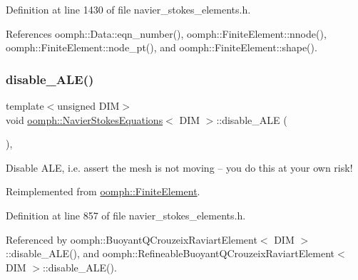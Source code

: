 Definition at line 1430 of file navier\+\_\+stokes\+\_\+elements.\+h.



References oomph\+::\+Data\+::eqn\+\_\+number(), oomph\+::\+Finite\+Element\+::nnode(), oomph\+::\+Finite\+Element\+::node\+\_\+pt(), and oomph\+::\+Finite\+Element\+::shape().

\mbox{\label{classoomph_1_1NavierStokesEquations_a09f47fe68a941eaf9a0080a166eea687}} 
\subsubsection{\texorpdfstring{disable\+\_\+\+A\+L\+E()}{disable\_ALE()}}
{\footnotesize\ttfamily template$<$unsigned D\+IM$>$ \\
void \hyperlink{classoomph_1_1NavierStokesEquations}{oomph\+::\+Navier\+Stokes\+Equations}$<$ D\+IM $>$\+::disable\+\_\+\+A\+LE (\begin{DoxyParamCaption}{ }\end{DoxyParamCaption})\hspace{0.3cm}{\ttfamily [inline]}, {\ttfamily [virtual]}}



Disable A\+LE, i.\+e. assert the mesh is not moving -- you do this at your own risk! 



Reimplemented from \hyperlink{classoomph_1_1FiniteElement_a625ea6d3f9baccfbdd1323315fb3ec71}{oomph\+::\+Finite\+Element}.



Definition at line 857 of file navier\+\_\+stokes\+\_\+elements.\+h.



Referenced by oomph\+::\+Buoyant\+Q\+Crouzeix\+Raviart\+Element$<$ D\+I\+M $>$\+::disable\+\_\+\+A\+L\+E(), and oomph\+::\+Refineable\+Buoyant\+Q\+Crouzeix\+Raviart\+Element$<$ D\+I\+M $>$\+::disable\+\_\+\+A\+L\+E().

\mbox{\label{classoomph_1_1NavierStokesEquations_af30c4ba5ebc5a97590cfafc076942472}} 
